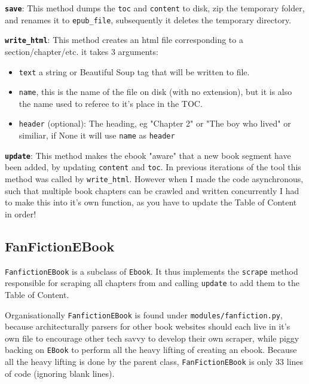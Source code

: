 \documentclass[]{report}   %
\begin{document}
\textbf{\texttt{save}}: This method dumps the \texttt{toc} and \texttt{content} to disk, zip the temporary folder, and renames it to \texttt{epub\_file}, subsequently it deletes the temporary directory.

\textbf{\texttt{write\_html}}: This method creates an html file corresponding to a section/chapter/etc. it takes 3 arguments:
\begin{itemize}
	\item \texttt{text} a string or Beautiful Soup tag that will be written to file.
	\item \texttt{name}, this is the name of the file on disk (with no extension), but it is also the name used to referee to it's place in the TOC. 
	\item \texttt{header} (optional): The heading, eg "Chapter 2" or "The boy who lived" or similiar, if None it will use \texttt{name} as \texttt{header}
\end{itemize}

\textbf{\texttt{update}}: This method makes the ebook "aware" that a new book segment
have been added, by updating \texttt{content} and \texttt{toc}. In previous
iterations of the tool this method was called by \texttt{write\_html}. However
when I made the code asynchronous, such that multiple book chapters can be
crawled and written concurrently I had to make this into it's own function, as
you have to update the Table of Content in order!

\subsection{FanFictionEBook}
\label{sec:FanFictionEBook}
\texttt{FanfictionEBook} is a subclass of \texttt{Ebook}. It thus implements the \texttt{scrape} method responsible for scraping all chapters from and calling \texttt{update} to add them to the Table of Content.

Organisationally \texttt{FanfictionEBook} is found under
\texttt{modules/fanfiction.py}, because architecturally parsers for other book
websites should each live in it's own file to encourage other tech savvy to
develop their own scraper, while piggy backing on \texttt{EBook} to perform all
the heavy lifting of creating an ebook. Because all the heavy lifting is done
by the parent class, \texttt{FanFictionEBook} is only 33 lines of code
(ignoring blank lines). 
\end{document}
